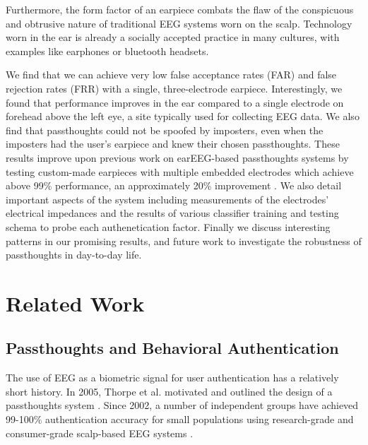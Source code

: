\documentclass{sigchi}
\begin{document}
Furthermore, the form factor of an earpiece combats the flaw of the conspicuous and obtrusive nature of traditional EEG systems worn on the scalp. Technology worn in the ear is already a socially accepted practice in many cultures, with examples like earphones or bluetooth headsets.

We find that we can achieve very low false acceptance rates (FAR) and false rejection rates (FRR) with a single, three-electrode earpiece. Interestingly, we found that performance improves in the ear compared to a single electrode on forehead above the left eye, a site typically used for collecting EEG data. We also find that passthoughts could not be spoofed by imposters, even when the imposters had the user's earpiece and knew their chosen passthoughts. These results improve upon previous work on earEEG-based passthoughts systems by testing custom-made earpieces with multiple embedded electrodes which achieve above 99\% performance, an approximately 20\% improvement \cite{curran2016passthoughts}. We also detail important aspects of the system including measurements of the electrodes' electrical impedances and the results of various classifier training and testing schema to probe each authenetication factor. Finally we discuss interesting patterns in our promising results, and future work to investigate the robustness of passthoughts in day-to-day life.

\section{Related Work}

\subsection{Passthoughts and Behavioral Authentication}
The use of EEG as a biometric signal for user authentication has a relatively short history.
In 2005, Thorpe et al. motivated and outlined the design of a passthoughts system \cite{Thorpe2005}.
Since 2002, a number of independent groups have achieved 99-100\% authentication accuracy for small populations using research-grade and consumer-grade scalp-based EEG systems \cite{Poulos2002,Marcel2007a,Ashby2011,Chuang2013b}.
\end{document}
